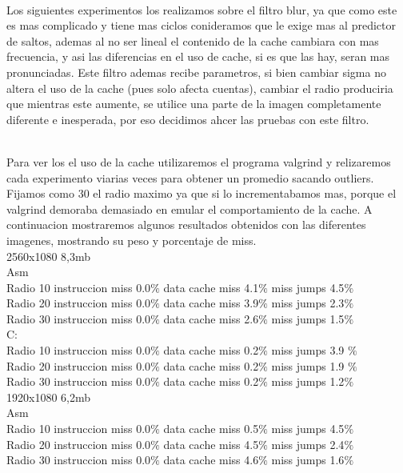 \\
Los siguientes experimentos los realizamos sobre el filtro blur, ya que como este es mas complicado y tiene mas ciclos conideramos que le exige mas al predictor de saltos, ademas al no ser lineal el contenido de la cache cambiara con mas frecuencia, y asi las diferencias en el uso de cache, si es que las hay, seran mas pronunciadas. Este filtro ademas recibe parametros, si bien cambiar sigma no altera el uso de la cache (pues solo afecta cuentas), cambiar el radio produciria que mientras este aumente, se utilice una parte de la imagen completamente diferente e inesperada, por eso decidimos ahcer las pruebas con este filtro.

\\
Para ver los el uso de la cache utilizaremos el programa valgrind y relizaremos cada experimento viarias veces para obtener un promedio sacando outliers. Fijamos como 30 el radio maximo ya que si lo incrementabamos mas, porque el  valgrind demoraba demasiado en emular el comportamiento de la cache. A continuacion mostraremos algunos resultados obtenidos con las diferentes imagenes, mostrando su peso y porcentaje de miss. \\

2560x1080 8,3mb \\

Asm \\
	Radio 10   instruccion miss   0.0$\%$  data cache miss  4.1$\%$ miss jumps   4.5$\%$ \\
	Radio 20   instruccion miss   0.0$\%$  data cache miss  3.9$\%$ miss jumps   2.3$\%$ \\	
	Radio 30   instruccion miss   0.0$\%$  data cache miss  2.6$\%$ miss jumps   1.5$\%$ \\

C: \\
	Radio 10  instruccion miss  0.0$\%$  data cache miss 0.2$\%$ miss jumps  3.9 $\%$  \\
	Radio 20  instruccion miss  0.0$\%$  data cache miss 0.2$\%$ miss jumps   1.9 $\%$  \\
	Radio 30  instruccion miss  0.0$\%$  data cache miss 0.2$\%$ miss jumps   1.2$\%$  \\ 

1920x1080 6,2mb \\

Asm \\
	Radio 10   instruccion miss   0.0$\%$  data cache miss  0.5$\%$ miss jumps   4.5$\%$ \\
	Radio 20   instruccion miss   0.0$\%$  data cache miss  4.5$\%$ miss jumps   2.4$\%$ \\	
	Radio 30   instruccion miss   0.0$\%$  data cache miss  4.6$\%$ miss jumps   1.6$\%$ \\

